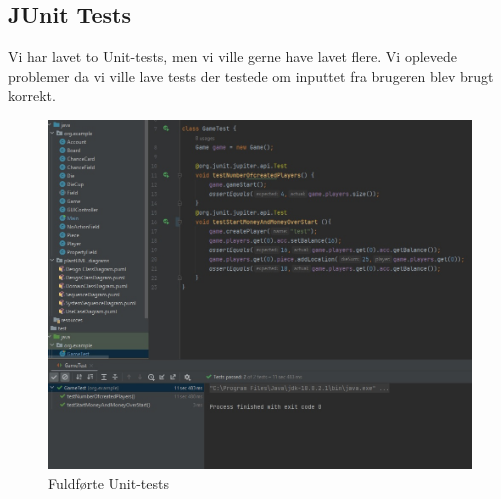 \documentclass{article}
\begin{document}
\subsection{JUnit Tests}
Vi har lavet to Unit-tests, men vi ville gerne have lavet flere. Vi oplevede problemer da vi ville lave tests der testede om inputtet fra brugeren blev brugt korrekt.
\begin{figure} [h]
    \centering
    \includegraphics[width = \textwidth]{Billeder/UnitTests.jpg}
    \caption{Fuldførte Unit-tests}
    \label{fig:my_label}
\end{figure}
\end{document}
